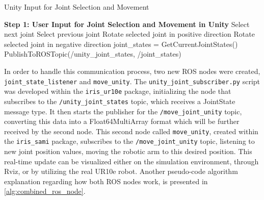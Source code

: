\begin{algorithm}
    \caption{Unity Input for Joint Selection and Movement}\label{alg:unity_input}
    \begin{algorithmic}[1]
        \State \textbf{Step 1: User Input for Joint Selection and Movement in Unity}
                \State Select next joint
                \State Select previous joint
            \EndIf
                \State Rotate selected joint in positive direction
                \State Rotate selected joint in negative direction
            \EndIf
                \State joint\_states = GetCurrentJointStates()
                \State PublishToROSTopic(/unity\_joint\_states, /joint\_states)
            \EndIf
        \EndWhile
    \end{algorithmic}
\end{algorithm}


In order to handle this communication process, two new \ac{ROS} nodes were created, \texttt{joint\_state\_listener} and \texttt{move\_unity}. The \texttt{unity\_joint\_subscriber.py} script was developed within the \texttt{iris\_ur10e} package, initializing the node that subscribes to the \texttt{/unity\_joint\_states} topic, which receives a JointState message type. It then starts the publisher for the \texttt{/move\_joint\_unity} topic, converting this data into a Float64MultiArray format which will be further received by the second node. This second node called \texttt{move\_unity}, created within the \texttt{iris\_sami} package, subscribes to the \texttt{/move\_joint\_unity} topic, listening to new joint position values, moving the robotic arm to this desired position. This real-time update can be visualized either on the simulation environment, through Rviz, or by utilizing the real UR10e robot. Another pseudo-code algorithm explanation regarding how both \ac{ROS} nodes work, is presented in \ref{alg:combined_ros_node}.



